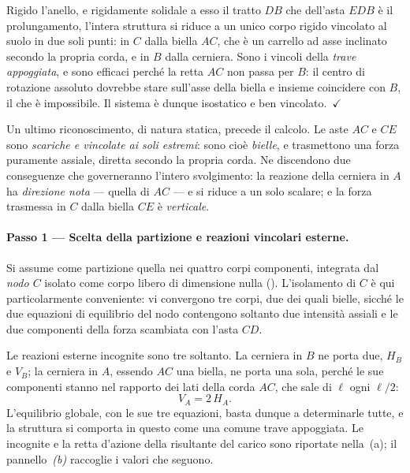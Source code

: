 \begin{esercizio}
\begin{svolgimento}
		Rigido l'anello, e rigidamente solidale a esso il tratto $DB$ che
		dell'asta $EDB$ è il prolungamento, l'intera struttura si riduce a un
		unico corpo rigido vincolato al suolo in due soli punti: in $C$ dalla
		biella $AC$, che è un carrello ad asse inclinato secondo la propria
		corda, e in $B$ dalla cerniera. Sono i vincoli della \emph{trave
			appoggiata}, e sono efficaci perché la retta $AC$ non passa per $B$:
		il centro di rotazione assoluto dovrebbe stare sull'asse della biella
		e insieme coincidere con $B$, il che è impossibile. Il sistema è
		dunque isostatico e ben vincolato.~$\checkmark$
		
		Un ultimo riconoscimento, di natura statica, precede il calcolo. Le
		aste $AC$ e $CE$ sono \emph{scariche e vincolate ai soli estremi}:
		sono cioè \emph{bielle}, e trasmettono una forza puramente assiale,
		diretta secondo la propria corda. Ne discendono due conseguenze che
		governeranno l'intero svolgimento: la reazione della cerniera in $A$
		ha \emph{direzione nota} --- quella di $AC$ --- e si riduce a un solo
		scalare; e la forza trasmessa in $C$ dalla biella $CE$ è
		\emph{verticale}.
		
		\paragraph{Passo 1 --- Scelta della partizione e reazioni vincolari
			esterne.}
		
		Si assume come partizione quella nei quattro corpi componenti,
		integrata dal \emph{nodo $C$} isolato come corpo libero di dimensione
		nulla (). L'isolamento di $C$ è qui
		particolarmente conveniente: vi convergono tre corpi, due dei quali
		bielle, sicché le due equazioni di equilibrio del nodo contengono
		soltanto due intensità assiali e le due componenti della forza
		scambiata con l'asta $CD$.
		
		Le reazioni esterne incognite sono tre soltanto. La cerniera in $B$
		ne porta due, $H_B$ e $V_B$; la cerniera in $A$, essendo $AC$ una
		biella, ne porta una sola, perché le sue componenti stanno nel
		rapporto dei lati della corda $AC$, che sale di $\ell$ ogni $\ell/2$:
		\begin{equation}
			\label{eq:anelloTA_direzioneA}
			V_A = 2\,H_A .
		\end{equation}
		L'equilibrio globale, con le sue tre equazioni, basta dunque a
		determinarle tutte, e la struttura si comporta in questo come una
		comune trave appoggiata. Le incognite e la retta d'azione della risultante del carico sono
		riportate nella \,(a); il
		pannello~\emph{(b)} raccoglie i valori che seguono.
		

\end{svolgimento}
\end{esercizio}
